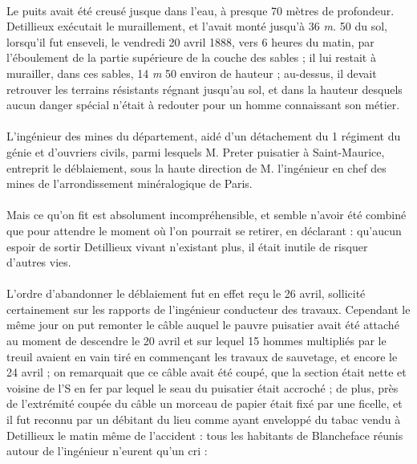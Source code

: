 \documentclass[../eBook.tex]{subfiles}
\begin{document}
      \paragraph{}Le puits avait été creusé jusque dans l'eau, à presque 70 mètres de profondeur. Detillieux exécutait le muraillement, et l'avait monté jusqu'à 36 \textit{m.} 50 du sol, lorsqu'il fut enseveli, le vendredi 20 avril 1888, vers 6 heures du matin, par l'éboulement de la partie supérieure de la couche des sables ; il lui restait à murailler, dans ces sables, 14 \textit{m} 50 environ de hauteur ; au-dessus, il devait retrouver les terrains résistants régnant jusqu'au sol, et dans la hauteur desquels aucun danger spécial n'était à redouter pour un homme connaissant son métier.
      \paragraph{}L'ingénieur des mines du département, aidé d'un détachement du 1 régiment du génie et d'ouvriers civils, parmi lesquels M. Preter puisatier à Saint-Maurice, entreprit le déblaiement, sous la haute direction de M. l'ingénieur en chef des mines de l'arrondissement minéralogique de Paris.
      \paragraph{}Mais ce qu'on fit est absolument incompréhensible, et semble n'avoir été combiné que pour attendre le moment où l'on pourrait se retirer, en déclarant : qu'aucun espoir de sortir Detillieux vivant n'existant plus, il était inutile de risquer d'autres vies.
      \paragraph{}L'ordre d'abandonner le déblaiement fut en effet reçu le 26 avril, sollicité certainement sur les rapports de l'ingénieur conducteur des travaux. Cependant le même jour on put remonter le câble auquel le pauvre puisatier avait été attaché au moment de descendre le 20 avril et sur lequel 15 hommes multipliés par le treuil avaient en vain tiré en commençant les travaux de sauvetage, et encore le 24 avril ; on remarquait que ce câble avait été coupé, que la section était nette et voisine de l'S en fer par lequel le seau du puisatier était accroché ; de plus, près de l'extrémité coupée du câble un morceau de papier était fixé par une ficelle, et il fut reconnu par un débitant du lieu comme ayant enveloppé du tabac vendu à Detillieux le matin même de l'accident : tous les habitants de Blancheface réunis autour de l'ingénieur n'eurent qu'un cri :
\end{document}
